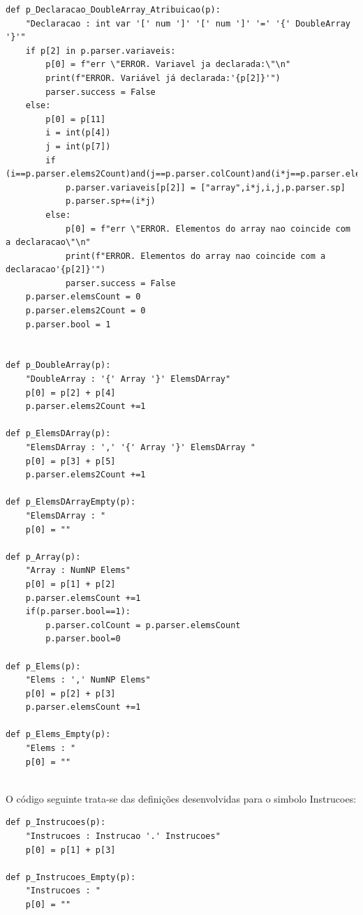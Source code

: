 \documentclass[11pt,a4paper]{report}
\begin{document}
\begin{verbatim}
def p_Declaracao_DoubleArray_Atribuicao(p):
    "Declaracao : int var '[' num ']' '[' num ']' '=' '{' DoubleArray '}'"
    if p[2] in p.parser.variaveis:
        p[0] = f"err \"ERROR. Variavel ja declarada:\"\n"
        print(f"ERROR. Variável já declarada:'{p[2]}'")
        parser.success = False
    else:
        p[0] = p[11]
        i = int(p[4])
        j = int(p[7])
        if (i==p.parser.elems2Count)and(j==p.parser.colCount)and(i*j==p.parser.elemsCount):
            p.parser.variaveis[p[2]] = ["array",i*j,i,j,p.parser.sp]
            p.parser.sp+=(i*j)
        else:
            p[0] = f"err \"ERROR. Elementos do array nao coincide com a declaracao\"\n"
            print(f"ERROR. Elementos do array nao coincide com a declaracao'{p[2]}'")
            parser.success = False
    p.parser.elemsCount = 0
    p.parser.elems2Count = 0
    p.parser.bool = 1


def p_DoubleArray(p):
    "DoubleArray : '{' Array '}' ElemsDArray"
    p[0] = p[2] + p[4]
    p.parser.elems2Count +=1

def p_ElemsDArray(p):
    "ElemsDArray : ',' '{' Array '}' ElemsDArray "
    p[0] = p[3] + p[5]
    p.parser.elems2Count +=1

def p_ElemsDArrayEmpty(p):
    "ElemsDArray : "
    p[0] = ""

def p_Array(p):
    "Array : NumNP Elems"
    p[0] = p[1] + p[2]
    p.parser.elemsCount +=1
    if(p.parser.bool==1):
        p.parser.colCount = p.parser.elemsCount
        p.parser.bool=0

def p_Elems(p):
    "Elems : ',' NumNP Elems"
    p[0] = p[2] + p[3]
    p.parser.elemsCount +=1

def p_Elems_Empty(p):
    "Elems : "
    p[0] = ""
   
\end{verbatim}
    
O código seguinte trata-se das definições desenvolvidas para o simbolo Instrucoes:

\begin {verbatim}
def p_Instrucoes(p):
    "Instrucoes : Instrucao '.' Instrucoes"
    p[0] = p[1] + p[3]

def p_Instrucoes_Empty(p):
    "Instrucoes : "
    p[0] = ""
\end{verbatim}
\end{document}
